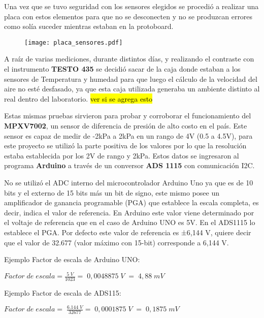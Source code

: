 Una vez que se tuvo seguridad con los sensores elegidos se procedió a realizar una placa con estos elementos para que no se desconecten y no se produzcan errores como solía suceder mientras estaban en la protoboard. \\
\begin{figure}[htb]
	\centering
	\texttt{[image: placa\_sensores.pdf]}
	\label{fig:sensoresa}
\end{figure}

A raíz de varias mediciones, durante distintos días, y realizando el contraste con el instrumento \textbf{TESTO 435} se decidió sacar de la caja donde estaban a los sensores de Temperatura y humedad para que luego el cálculo de la velocidad del aire no esté desfasado, ya que esta caja utilizada generaba un ambiente distinto al real dentro del laboratorio. \hl{ver si se agrega esto}

Estas mismas pruebas sirvieron para probar y corroborar el funcionamiento del \textbf{MPXV7002}, un sensor de diferencia de presión de alto costo en el país. Este sensor es capaz de medir de -2kPa a 2kPa en un rango de 4V (0.5 a 4.5V), para este proyecto se utilizó la parte positiva de los valores por lo que la resolución estaba establecida por los 2V de rango y 2kPa. Estos datos se ingresaron al programa \textbf{Arduino} a través de un conversor \textbf{ADS 1115} con comunicación I2C.

No se utilizó el ADC interno del microcontrolador Arduino Uno ya que es de 10 bits y el externo de 15 bits más un bit de signo, este mismo posee un amplificador de ganancia programable (PGA) que establece la escala completa, es decir, indica el valor de referencia. En Arduino este valor viene determinado por el voltaje de referencia que en el caso de Arduino UNO es 5V. En el ADS1115 lo establece el PGA. Por defecto este valor de referencia es ±6,144 V, quiere decir que el valor de 32.677 (valor máximo con 15-bit) corresponde a 6,144 V.

Ejemplo Factor de escala de Arduino UNO:
\begin{center}
	\begin{math}Factor\;de\;escala=\frac{5\;V}{1023}=\;0,0048875\;V\;=\;4,88\;mV
	\end{math}
\end{center}
Ejemplo Factor de escala de ADS115:
\begin{center}
	\begin{math}Factor\;de\;escala=\;\frac{6.144\;V}{32677}=\;0,0001875\;V\;=\;0,1875\;mV
	\end{math}
\end{center}

